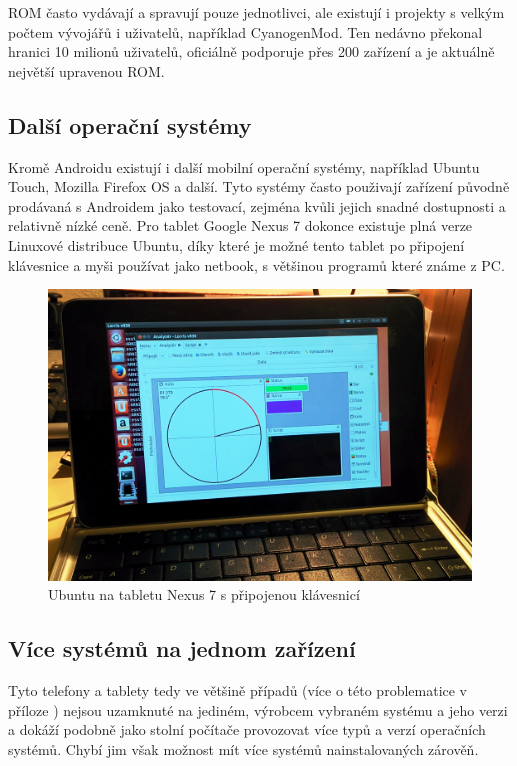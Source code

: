 \documentclass[12pt, a4paper, oneside]{article}
\begin{document}
ROM často vydávají a spravují pouze jednotlivci, ale existují i projekty s velkým počtem vývojářů i uživatelů, například CyanogenMod\cite{CM}. Ten nedávno překonal hranici 10 milionů uživatelů, oficiálně podporuje přes 200 zařízení a je aktuálně největší upravenou ROM.

\subsection{Další operační systémy}
Kromě Androidu existují i další mobilní operační systémy, například Ubuntu Touch\cite{utouch}, Mozilla Firefox OS\cite{firefoxos} a další. Tyto systémy často použivají zařízení původně prodávaná s Androidem jako testovací, zejména kvůli jejich snadné dostupnosti a relativně nízké ceně. Pro tablet Google Nexus 7 dokonce existuje plná verze Linuxové distribuce Ubuntu, díky které je možné tento tablet po připojení klávesnice a myši používat jako netbook, s většinou programů které známe z PC.

\begin{figure}[H]
\begin{center}
\includegraphics[width=\textwidth]{img/n7_ubuntu.jpg}
\caption{Ubuntu na tabletu Nexus 7 s připojenou klávesnicí}
\label{split_img}
\end{center}
\end{figure}


\subsection{Více systémů na jednom zařízení}
Tyto telefony a tablety tedy ve většině případů (více o této problematice v příloze ) nejsou uzamknuté na jediném, výrobcem vybraném systému a jeho verzi a dokáží podobně jako stolní počítače provozovat více typů a verzí operačních systémů. Chybí jim však možnost mít více systémů nainstalovaných zárověň.
\end{document}
